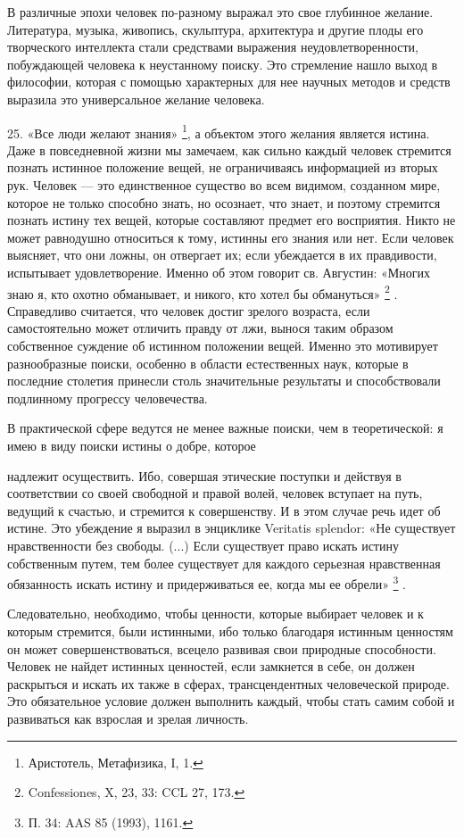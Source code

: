 \documentclass[a5paper,10pt]{article}
\begin{document}
В различные эпохи человек по-разному выражал это свое глубинное желание.
Литература, музыка, живопись, скульптура, архитектура и другие плоды его
творческого интеллекта стали средствами выражения неудовлетворенности,
побуждающей человека к неустанному поиску. Это стремление нашло выход в
философии, которая с помощью характерных для нее научных методов и средств
выразила это универсальное желание человека.

25. «Все люди желают знания» \footnote{Аристотель, Метафизика, I, 1.}, а
объектом этого желания является истина. Даже в повседневной жизни мы замечаем,
как сильно каждый человек стремится познать истинное положение вещей, не
ограничиваясь информацией из вторых рук. Человек — это единственное существо во
всем видимом, созданном мире, которое не только способно знать, но осознает,
что знает, и поэтому стремится познать истину тех вещей, которые составляют
предмет его восприятия. Никто не может равнодушно относиться к тому, истинны
его знания или нет. Если человек выясняет, что они ложны, он отвергает их; если
убеждается в их правдивости, испытывает удовлетворение. Именно об этом говорит
св. Августин: «Многих знаю я, кто охотно обманывает, и никого, кто хотел бы
обмануться» \footnote{Confessiones, X, 23, 33: CCL 27, 173.} . Справедливо
считается, что человек достиг зрелого возраста, если самостоятельно может
отличить правду от лжи, вынося таким образом собственное суждение об истинном
положении вещей.  Именно это мотивирует разнообразные поиски, особенно в
области естественных наук, которые в последние столетия принесли столь
значительные результаты и способствовали подлинному прогрессу человечества.

В практической сфере ведутся не менее важные поиски, чем в теоретической: я
имею в виду поиски истины о добре, которое

надлежит осуществить. Ибо, совершая этические поступки и действуя в
соответствии со своей свободной и правой волей, человек вступает на путь,
ведущий к счастью, и стремится к совершенству. И в этом случае речь идет об
истине. Это убеждение я выразил в энциклике Veritatis splendor: «Не существует
нравственности без свободы. (...) Если существует право искать истину
собственным путем, тем более существует для каждого серьезная нравственная
обязанность искать истину и придерживаться ее, когда мы ее обрели» \footnote{П.
34: AAS 85 (1993), 1161.} .

Следовательно, необходимо, чтобы ценности, которые выбирает человек и к которым
стремится, были истинными, ибо только благодаря истинным ценностям он может
совершенствоваться, всецело развивая свои природные способности. Человек не
найдет истинных ценностей, если замкнется в себе, он должен раскрыться и искать
их также в сферах, трансцендентных человеческой природе. Это обязательное
условие должен выполнить каждый, чтобы стать самим собой и развиваться как
взрослая и зрелая личность.
\end{document}
